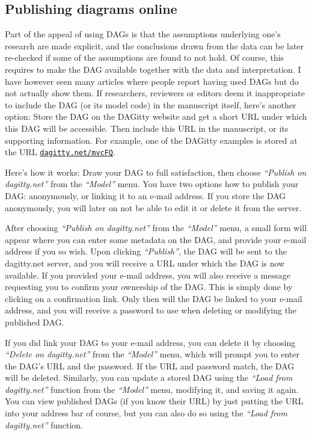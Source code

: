 \documentclass[a4paper,10pt]{article}
\newcommand{\pname}{{\sc DAG}itty\xspace}
\newcommand{\action}[1]{\emph{``#1''}}
\begin{document}
\subsection{Publishing diagrams online}

Part of the appeal of using DAGs is that the assumptions underlying
one's research are made explicit, and the conclusions drawn from 
the data can be later re-checked if some of the assumptions are found
to not hold. Of course, this requires to make the DAG available together
with the data and interpretation. I have however seen many articles
where people report having used DAGs but do not actually show them.
If researchers, reviewers or editors deem it inappropriate to include the 
DAG (or its model code) in the manuscript itself, here's another option:
Store the DAG on the \pname website and get a short URL under which
this DAG will be accessible. Then include this URL in the manuscript,
or its supporting information. For example, one of the \pname examples
is stored at the URL \href{http://dagitty.net/mvcFQ}{\tt dagitty.net/mvcFQ}.

Here's how it works: Draw your DAG to full satisfaction, then choose 
\action{Publish on dagitty.net} from the \action{Model} menu. You have
two options how to publish your DAG: anonymously, or linking it to an e-mail
address. If you store the DAG anonymously, you will later on not be able
to edit it or delete it from the server.

After choosing \action{Publish on dagitty.net} from the \action{Model} menu,
a small form will appear where you can enter some metadata on the DAG,
and provide your e-mail address if you so wish. Upon clicking \action{Publish},
the DAG will be sent to the dagitty.net server, and you will receive a URL under
which the DAG is now available. If you provided your e-mail address, you
will also receive a message requesting you to confirm your ownership of the DAG.
This is simply done by clicking on a confirmation link. Only then will the DAG
be linked to your e-mail address, and you will receive a password to use when
deleting or modifying the published DAG.

If you did link your DAG to your e-mail address, you can delete it by choosing
\action{Delete on dagitty.net} from the \action{Model} menu, which will prompt you
to enter the DAG's URL and the password. If the URL and password match,
the DAG will be deleted.
Similarly, you can update a stored DAG using the \action{Load from dagitty.net} function
from the  \action{Model} menu, modifying it, and saving it again. 
You can view published DAGs (if you know their URL)
by just putting the URL into your address bar of course, but you can also do
so using the \action{Load from dagitty.net} function. 
\end{document}
